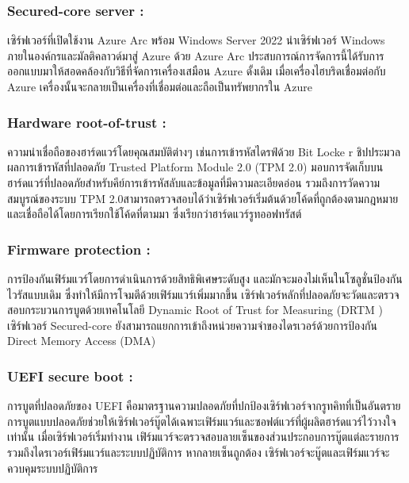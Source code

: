 \hspace{1cm}\subsubsection{Secured-core server :}เซิร์ฟเวอร์ที่เปิดใช้งาน Azure Arc พร้อม Windows Server 2022 นำเซิร์ฟเวอร์ Windows ภายในองค์กรและมัลติคลาวด์มาสู่ Azure ด้วย Azure Arc ประสบการณ์การจัดการนี้ได้รับการออกแบบมาให้สอดคล้องกับวิธีที่จัดการเครื่องเสมือน Azure ดั้งเดิม เมื่อเครื่องไฮบริดเชื่อมต่อกับ Azure เครื่องนั้นจะกลายเป็นเครื่องที่เชื่อมต่อและถือเป็นทรัพยากรใน Azure 

\hspace{1cm}\subsubsection{Hardware root-of-trust :}ความน่าเชื่อถือของฮาร์ดแวร์โดยคุณสมบัติต่างๆ เช่นการเข้ารหัสไดรฟ์ด้วย Bit Locke r ชิปประมวลผลการเข้ารหัสที่ปลอดภัย Trusted Platform Module 2.0 (TPM 2.0) มอบการจัดเก็บบนฮาร์ดแวร์ที่ปลอดภัยสำหรับคีย์การเข้ารหัสลับและข้อมูลที่มีความละเอียดอ่อน รวมถึงการวัดความสมบูรณ์ของระบบ TPM 2.0สามารถตรวจสอบได้ว่าเซิร์ฟเวอร์เริ่มต้นด้วยโค้ดที่ถูกต้องตามกฎหมาย และเชื่อถือได้โดยการเรียกใช้โค้ดที่ตามมา ซึ่งเรียกว่าฮาร์ดแวร์รูทออฟทรัสต์ 

\hspace{1cm}\subsubsection{Firmware protection :}การป้องกันเฟิร์มแวร์โดยการดำเนินการด้วยสิทธิพิเศษระดับสูง และมักจะมองไม่เห็นในโซลูชั่นป้องกันไวรัสแบบเดิม ซึ่งทำให้มีการโจมตีด้วยเฟิร์มแวร์เพิ่มมากขึ้น เซิร์ฟเวอร์หลักที่ปลอดภัยจะวัดและตรวจสอบกระบวนการบูตด้วยเทคโนโลยี Dynamic Root of Trust for Measuring (DRTM ) เซิร์ฟเวอร์ Secured-core ยังสามารถแยกการเข้าถึงหน่วยความจำของไดรเวอร์ด้วยการป้องกัน Direct Memory Access (DMA) 
\clearpage

\hspace{1cm}\subsubsection{UEFI secure boot :}การบูตที่ปลอดภัยของ UEFI คือมาตรฐานความปลอดภัยที่ปกป้องเซิร์ฟเวอร์จากรูทคิทที่เป็นอันตราย การบูตแบบปลอดภัยช่วยให้เซิร์ฟเวอร์บู๊ตได้เฉพาะเฟิร์มแวร์และซอฟต์แวร์ที่ผู้ผลิตฮาร์ดแวร์ไว้วางใจเท่านั้น เมื่อเซิร์ฟเวอร์เริ่มทำงาน เฟิร์มแวร์จะตรวจสอบลายเซ็นของส่วนประกอบการบู๊ตแต่ละรายการ รวมถึงไดรเวอร์เฟิร์มแวร์และระบบปฏิบัติการ หากลายเซ็นถูกต้อง เซิร์ฟเวอร์จะบู๊ตและเฟิร์มแวร์จะควบคุมระบบปฏิบัติการ 

